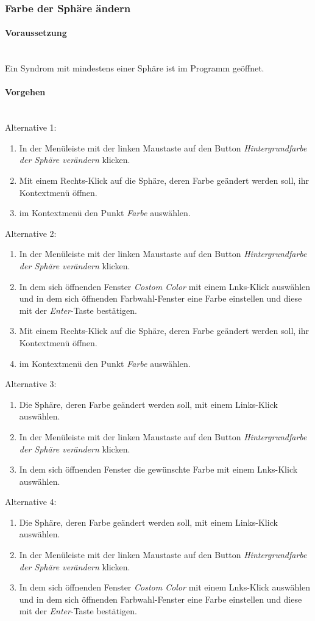 \documentclass[enabledeprecatedfontcommands,fontsize=11pt,paper=a4,twoside]{scrartcl}
\newcommand*{\condition}{\paragraph{Voraussetzung}$\;$ \vspace{0.2cm}\\}
\newcommand*{\actions}{\paragraph{Vorgehen} $\;$\vspace{0.2cm}\\}
\begin{document}
		\subsubsection{Farbe der Sphäre ändern}
				\condition 	
		Ein Syndrom mit mindestens einer Sphäre ist im Programm geöffnet. 
		\actions  
		Alternative 1:
		\begin{enumerate}
			\item In der Menüleiste mit der linken Maustaste auf den Button \textit{Hintergrundfarbe der Sphäre verändern} klicken.
			\item Mit einem Rechts-Klick auf die Sphäre, deren Farbe geändert werden soll, ihr Kontextmenü öffnen.
			\item im Kontextmenü den Punkt \textit{Farbe} auswählen.
		\end{enumerate}
		Alternative 2:
		\begin{enumerate}
			\item In der Menüleiste mit der linken Maustaste auf den Button \textit{Hintergrundfarbe der Sphäre verändern} klicken.
			\item In dem sich öffnenden Fenster \textit{Costom Color} mit einem Lnks-Klick auswählen und in dem sich öffnenden Farbwahl-Fenster eine Farbe einstellen und diese mit der \textit{Enter}-Taste bestätigen.
			 \item Mit einem Rechts-Klick auf die Sphäre, deren Farbe geändert werden soll, ihr Kontextmenü öffnen.
			\item im Kontextmenü den Punkt \textit{Farbe} auswählen.
		\end{enumerate}
		Alternative 3:
		\begin{enumerate}
			\item Die Sphäre, deren Farbe geändert werden soll, mit einem Links-Klick auswählen.
			\item In der Menüleiste mit der linken Maustaste auf den Button \textit{Hintergrundfarbe der Sphäre verändern} klicken.
			\item In dem sich öffnenden Fenster die gewünschte Farbe mit einem Lnks-Klick auswählen.
		\end{enumerate}
		Alternative 4:
			\begin{enumerate}
			\item Die Sphäre, deren Farbe geändert werden soll, mit einem Links-Klick auswählen.
			\item In der Menüleiste mit der linken Maustaste auf den Button \textit{Hintergrundfarbe der Sphäre verändern} klicken.
			\item In dem sich öffnenden Fenster \textit{Costom Color} mit einem Lnks-Klick auswählen und in dem sich öffnenden Farbwahl-Fenster eine Farbe einstellen und diese mit der \textit{Enter}-Taste bestätigen.
		\end{enumerate}
\end{document}
